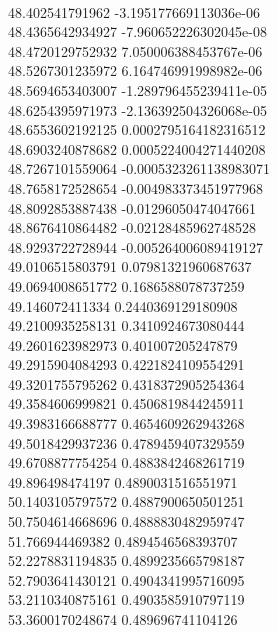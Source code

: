 { \\
48.402541791962 -3.195177669113036e-06
 \\
48.4365642934927 -7.960652226302045e-08
 \\
48.4720129752932 7.050006388453767e-06
 \\
48.5267301235972 6.164746991998982e-06
 \\
48.5694653403007 -1.289796455239411e-05
 \\
48.6254395971973 -2.136392504326068e-05
 \\
48.6553602192125 0.0002795164182316512
 \\
48.6903240878682 0.0005224004271440208
 \\
48.7267101559064 -0.0005323261138983071
 \\
48.7658172528654 -0.004983373451977968
 \\
48.8092853887438 -0.01296050474047661
 \\
48.8676410864482 -0.02128485962748528
 \\
48.9293722728944 -0.005264006089419127
 \\
49.0106515803791 0.07981321960687637
 \\
49.0694008651772 0.1686588078737259
 \\
49.146072411334 0.2440369129180908
 \\
49.2100935258131 0.3410924673080444
 \\
49.2601623982973 0.401007205247879
 \\
49.2915904084293 0.4221824109554291
 \\
49.3201755795262 0.4318372905254364
 \\
49.3584606999821 0.4506819844245911
 \\
49.3983166688777 0.4654609262943268
 \\
49.5018429937236 0.4789459407329559
 \\
49.6708877754254 0.4883842468261719
 \\
49.896498474197 0.4890031516551971
 \\
50.1403105797572 0.4887900650501251
 \\
50.7504614668696 0.4888830482959747
 \\
51.766944469382 0.4894546568393707
 \\
52.2278831194835 0.4899235665798187
 \\
52.7903641430121 0.4904341995716095
 \\
53.2110340875161 0.4903585910797119
 \\
53.3600170248674 0.489696741104126
 \\
}
